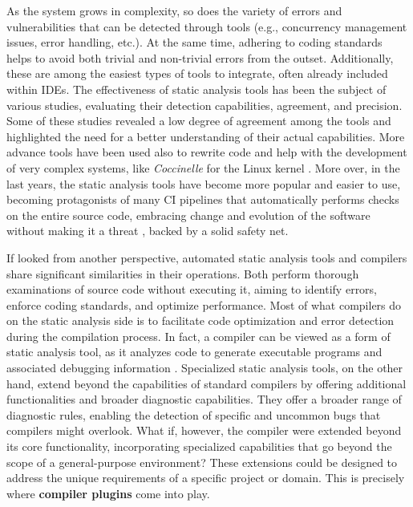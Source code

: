 \documentclass[12pt,a4paper,openright,twoside]{book}
\begin{document}
As the system grows in complexity, so does the variety of errors and
vulnerabilities that can be detected through tools (e.g., concurrency management
issues, error handling, etc.). At the same time, adhering to coding standards
helps to avoid both trivial and non-trivial errors from the outset.
Additionally, these are among the easiest types of tools to integrate, often
already included within \acp{IDE}.
%
The effectiveness of static analysis tools has been the subject of various
studies,  \cite{DBLP:journals/jss/LenarduzziPSLP23} evaluating their detection
capabilities, agreement, and precision. Some of these studies revealed a low
degree of agreement among the tools and highlighted the need for a better
understanding of their actual capabilities. More advance tools have been used
also to rewrite code and help with the development of very complex systems,
like \emph{Coccinelle} for the Linux kernel
\cite{DBLP:conf/eurosys/PadioleauLHM08}\cite{DBLP:conf/usenix/LawallM18}.
%
More over, in the last years, the static analysis tools have become more popular
and easier to use, becoming protagonists of many \ac{CI} pipelines
\cite{DBLP:conf/msr/ZampettiSOCP17} that automatically performs checks on the
entire source code, embracing change and evolution of the software without
making it a threat \cite{DBLP:books/daglib/0015650}, backed by a solid safety
net.

If looked from another perspective, automated static analysis tools and
compilers share significant similarities in their operations. Both perform
thorough examinations of source code without executing it, aiming to identify
errors, enforce coding standards, and optimize performance. Most of what
compilers do on the static analysis side is to facilitate code optimization and
error detection during the compilation process. In fact, a compiler can be
viewed as a form of static analysis tool, as it analyzes code to generate
executable programs and associated debugging information
\cite{DBLP:journals/queue/Thomson21}.
%
Specialized static analysis tools, on the other hand, extend beyond the
capabilities of standard compilers by offering additional functionalities and
broader diagnostic capabilities. They offer a broader range of diagnostic rules,
enabling the detection of specific and uncommon bugs that compilers might
overlook.
%
What if, however, the compiler were extended beyond its core functionality,
incorporating specialized capabilities that go beyond the scope of a
general-purpose environment? These extensions could be designed to address the
unique requirements of a specific project or domain. This is precisely where
\textbf{compiler plugins} come into play.
\end{document}
